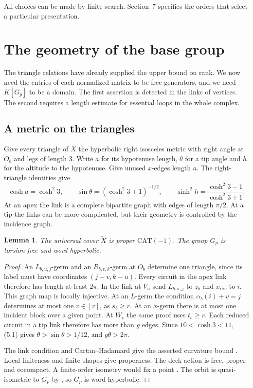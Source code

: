 \documentclass[11pt,a4paper]{article}
\newtheorem{lemma}[theorem]{Lemma}
\numberwithin{equation}{section}
\begin{document}
All choices can be made by finite search. Section~7 specifies the orders that select a particular presentation.

\section{The geometry of the base group}

The triangle relations have already supplied the upper bound on rank. We now need the entries of each normalized matrix to be free generators, and we need \(K[G_p]\) to be a domain. The first assertion is detected in the links of vertices. The second requires a length estimate for essential loops in the whole complex.

\subsection{A metric on the triangles}

Give every triangle of \(X\) the hyperbolic right isosceles metric with right angle at \(O_b\) and legs of length \(3\). Write \(a\) for its hypotenuse length, \(\theta\) for a tip angle and \(h\) for the altitude to the hypotenuse. Give unused \(x\)-edges length \(a\). The right-triangle identities give
\begin{equation}
 \cosh a=\cosh^2 3,\qquad
 \sin\theta=(\cosh^2 3+1)^{-1/2},\qquad
 \sinh^2h=\frac{\cosh^2 3-1}{\cosh^2 3+1}.
\end{equation}
At an apex the link is a complete bipartite graph with edges of length \(\pi/2\). At a tip the links can be more complicated, but their geometry is controlled by the incidence graph.

\begin{lemma}
The universal cover \(\widetilde X\) is proper \(\mathrm{CAT}(-1)\). The group \(G_p\) is torsion-free and word-hyperbolic.
\end{lemma}

\begin{proof}
An \(L_{b,u,j}\)-germ and an \(R_{b,v,k}\)-germ at \(O_b\) determine one triangle, since its label must have coordinates \((j-v,k-u)\). Every circuit in the apex link therefore has length at least \(2\pi\). In the link at \(V_u\) send \(L_{b,u,j}\) to \(z_b\) and \(x_{iuv}\) to \(i\). This graph map is locally injective. At an \(L\)-germ the condition \(\alpha_b(i)+v=j\) determines at most one \(v\in[r]\), as \(s_b\ge r\). At an \(x\)-germ there is at most one incident block over a given point. At \(W_v\) the same proof uses \(t_b\ge r\). Each reduced circuit in a tip link therefore has more than \(g\) edges. Since \(10<\cosh 3<11\), (5.1) gives \(\theta>\sin\theta>1/12\), and \(g\theta>2\pi\).

The link condition and Cartan--Hadamard give the asserted curvature bound \cite[I.7.50, II.5.2, II.5.6 and II.4.1(2)]{r7}. Local finiteness and finite shapes give properness. The deck action is free, proper and cocompact. A finite-order isometry would fix a point \cite[II.2.8(1)]{r7}. The orbit is quasi-isometric to \(G_p\) by \cite[I.8.19]{r7}, so \(G_p\) is word-hyperbolic.
\end{proof}
\end{document}
